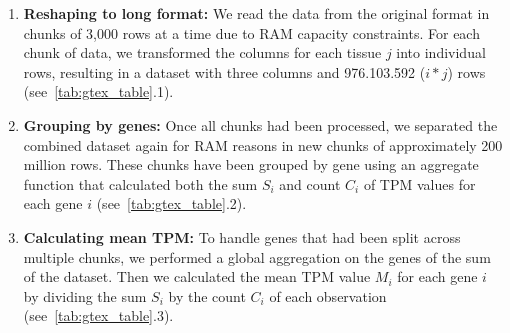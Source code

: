 \begin{enumerate}
    \item \textbf{Reshaping to long format:}
    We read the data from the original format in chunks of 3,000 rows at a time due to RAM capacity constraints.
    For each chunk of data, we transformed the columns for each tissue $j$ into individual rows,
    resulting in a dataset with three columns and 976.103.592 ($i * j$) rows (see~\cref{tab:gtex_table}.1).

    \item \textbf{Grouping by genes:}
    Once all chunks had been processed, we separated the combined dataset again for RAM reasons
    in new chunks of approximately 200 million rows.
    These chunks have been grouped by gene using an aggregate function that calculated
    both the sum $S_i$ and count $C_i$ of TPM values for each gene $i$ (see~\cref{tab:gtex_table}.2).

    \item \textbf{Calculating mean TPM:}
    To handle genes that had been split across multiple chunks,
    we performed a global aggregation on the genes of the sum of the dataset.
    Then we calculated the mean TPM value $M_i$ for each gene $i$ by dividing the sum $S_i$ by the count $C_i$
    of each observation (see~\cref{tab:gtex_table}.3).
\end{enumerate}

